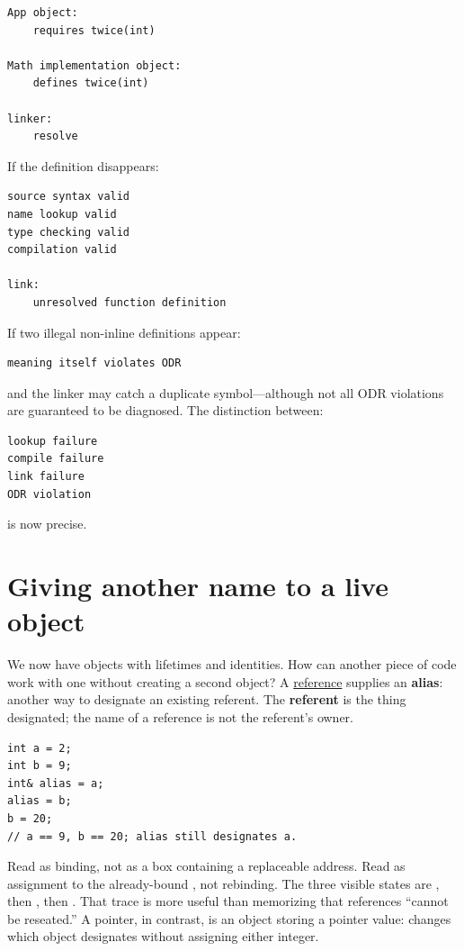 \begin{verbatim}
App object:
    requires twice(int)

Math implementation object:
    defines twice(int)

linker:
    resolve
\end{verbatim}

If the definition disappears:

\begin{verbatim}
source syntax valid
name lookup valid
type checking valid
compilation valid

link:
    unresolved function definition
\end{verbatim}

If two illegal non-inline definitions appear:

\begin{verbatim}
meaning itself violates ODR
\end{verbatim}

and the linker may catch a duplicate symbol---although not all ODR violations are guaranteed to be diagnosed. The distinction between:

\begin{verbatim}
lookup failure
compile failure
link failure
ODR violation
\end{verbatim}

is now precise.

\section{Giving another name to a live object}\label{01-foundations-i-ch003-giving-another-name-to-a-live-object}

\hypertarget{01-foundations-i-ch003-giving-another-name-to-a-live-object}{}

We now have objects with lifetimes and identities. How can another piece of code work with one without creating a second object? A \hyperref[appendix-d6d562ca9fbb]{reference} supplies an \textbf{alias}: another way to designate an existing referent. The \textbf{referent} is the thing designated; the name of a reference is not the referent's owner.

\begin{verbatim}
int a = 2;
int b = 9;
int& alias = a;
alias = b;
b = 20;
// a == 9, b == 20; alias still designates a.
\end{verbatim}

Read  as binding, not as a box containing a replaceable address. Read  as assignment to the already-bound , not rebinding. The three visible states are , then , then . That trace is more useful than memorizing that references ``cannot be reseated.'' A pointer, in contrast, is an object storing a pointer value:  changes which object  designates without assigning either integer.

